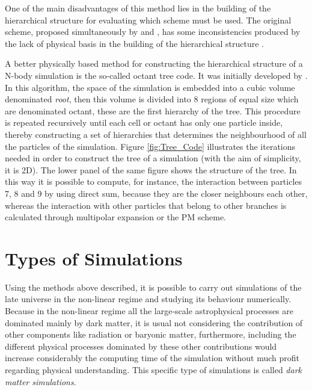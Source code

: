 One of the main disadvantages of this method lies in the building of the
hierarchical structure for evaluating which scheme must be used. The 
original scheme, proposed simultaneously by \cite{appel1985} 
\cite{jernigan1985} and \cite{porter1985}, has some inconsistencies 
produced by the lack of physical basis in the building of the hierarchical
structure \cite{pfalzner1996}.


A better physically based method for constructing the hierarchical 
structure of a N-body simulation is the so-called octant tree code. It was
initially developed by \cite{barnes1986}. In this algorithm, the space of 
the simulation is embedded into a cubic volume denominated \textit{root},
then this volume is divided into 8 regions of equal size which are 
denominated octant, these are the first hierarchy of the tree. This 
procedure is repeated recursively until each cell or octant has only one
particle inside, thereby constructing a set of hierarchies that determines
the neighbourhood of all the particles of the simulation. Figure 
\ref{fig:Tree_Code} illustrates the iterations needed in order to construct
the tree of a simulation (with the aim of simplicity, it is 2D). The lower
panel of the same figure shows the structure of the tree. In this way it
is possible to compute, for instance, the interaction between particles 7,
8 and 9 by using direct sum, because they are the closer neighbours each 
other, whereas the interaction with other particles that belong to other 
branches is calculated through multipolar expansion or the PM scheme.







\section{Types of Simulations}
\label{sec:Types of Simulations}


Using the methods above described, it is possible to carry out simulations
of the late universe in the non-linear regime and studying its behaviour 
numerically. Because in the non-linear regime all the large-scale 
astrophysical processes are dominated mainly by dark matter, it is usual 
not considering the contribution of other components like radiation or 
baryonic matter, furthermore, including the different physical processes
dominated by these other contributions would increase considerably the 
computing time of the simulation without much profit regarding physical
understanding. This specific type of simulations is called \textit{dark 
matter simulations}.


